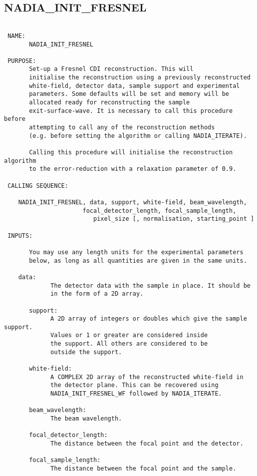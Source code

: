\subsection{NADIA\_INIT\_FRESNEL}
\begin{verbatim}

 NAME:
       NADIA_INIT_FRESNEL

 PURPOSE:
       Set-up a Fresnel CDI reconstruction. This will
       initialise the reconstruction using a previously reconstructed
       white-field, detector data, sample support and experimental 
       parameters. Some defaults will be set and memory will be
       allocated ready for reconstructing the sample
       exit-surface-wave. It is necessary to call this procedure before
       attempting to call any of the reconstruction methods
       (e.g. before setting the algorithm or calling NADIA_ITERATE).

       Calling this procedure will initialise the reconstruction algorithm
       to the error-reduction with a relaxation parameter of 0.9.

 CALLING SEQUENCE:

	NADIA_INIT_FRESNEL, data, support, white-field, beam_wavelength,
	                  focal_detector_length, focal_sample_length, 
                         pixel_size [, normalisation, starting_point ]

 INPUTS:

       You may use any length units for the experimental parameters
       below, as long as all quantities are given in the same units.

	data: 
             The detector data with the sample in place. It should be
             in the form of a 2D array.

       support: 
             A 2D array of integers or doubles which give the sample support.
             Values or 1 or greater are considered inside
             the support. All others are considered to be
             outside the support.

       white-field:
             A COMPLEX 2D array of the reconstructed white-field in
             the detector plane. This can be recovered using 
             NADIA_INIT_FRESNEL_WF followed by NADIA_ITERATE.

       beam_wavelength:
             The beam wavelength.

       focal_detector_length:
             The distance between the focal point and the detector.

       focal_sample_length:
             The distance between the focal point and the sample.


\end{verbatim}
